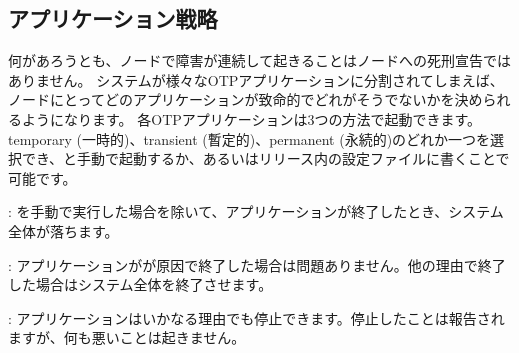 \subsection{アプリケーション戦略}
\label{subsec:start-link-application-strategies}

何があろうとも、ノードで障害が連続して起きることはノードへの死刑宣告ではありません。
システムが様々なOTPアプリケーションに分割されてしまえば、ノードにとってどのアプリケーションが致命的でどれがそうでないかを決められるようになります。
各OTPアプリケーションは3つの方法で起動できます。temporary (一時的)、transient (暫定的)、permanent (永続的)のどれか一つを選択でき、と手動で起動するか、あるいはリリース内の設定ファイルに書くことで可能です。

\begin{itemize*}
  \item {}: を手動で実行した場合を除いて、アプリケーションが終了したとき、システム全体が落ちます。
  \item {}: アプリケーションがが原因で終了した場合は問題ありません。他の理由で終了した場合はシステム全体を終了させます。
  \item {}: アプリケーションはいかなる理由でも停止できます。停止したことは報告されますが、何も悪いことは起きません。
\end{itemize*}

